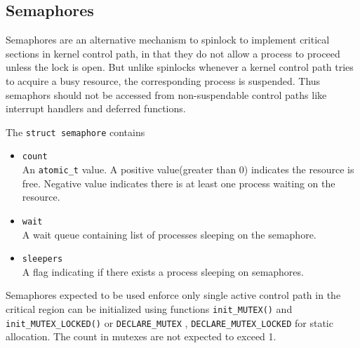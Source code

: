 \documentclass{article}
\begin{document}



\subsection{Semaphores}

Semaphores are an alternative mechanism to spinlock to implement
critical sections in kernel control path, in that they do not allow a
process to proceed unless the lock is open. But unlike spinlocks
whenever a kernel control path tries to acquire a busy resource, the
corresponding process is suspended. Thus semaphors should not be
accessed from non-suspendable control paths like interrupt handlers
and deferred functions.

The \lstinline{struct semaphore} contains

\begin{itemize}  
\item \lstinline{count} \\
  An \lstinline{atomic_t} value. A positive value(greater than 0)
  indicates the resource is free. Negative value indicates there is at
  least one process waiting on the resource.
\item \lstinline{wait} \\
  A wait queue containing list of processes sleeping on the semaphore.  
\item \lstinline{sleepers} \\
  A flag indicating if there exists a process sleeping on semaphores.    
\end{itemize}
Semaphores expected to be used enforce only single active control path
in the critical region can be initialized using functions
\lstinline{init_MUTEX()} and \lstinline{init_MUTEX_LOCKED()} or
\lstinline{DECLARE_MUTEX} , \lstinline{DECLARE_MUTEX_LOCKED} for
static allocation. The count in mutexes are not expected to exceed 1.
\end{document}
